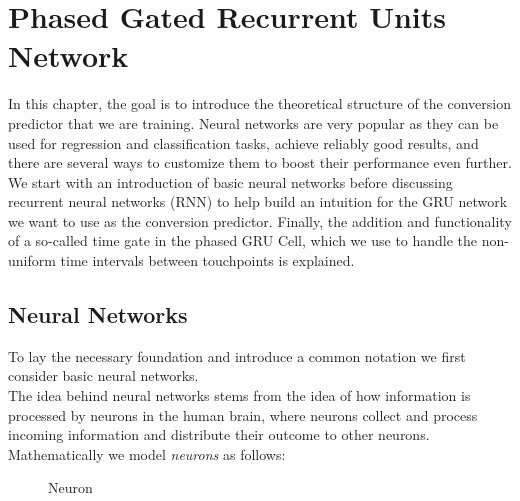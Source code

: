 
\chapter{Phased Gated Recurrent Units Network}
In this chapter, the goal is to introduce the theoretical structure of the conversion predictor that we are training. 
Neural networks are very popular as they can be used for regression and classification tasks, achieve reliably good results, and there are several ways to customize them to boost their performance even further.   \\
We start with an introduction of basic neural networks before discussing recurrent neural networks (RNN) to help build an intuition for the GRU network we want to use as the conversion predictor. 
Finally, the addition and functionality of a so-called time gate in the phased GRU Cell, which we use to handle the non-uniform time intervals between touchpoints is explained.

\section{Neural Networks}

To lay the necessary foundation and introduce a common notation we first consider basic neural networks. \\
The idea behind neural networks stems from the idea of how information is processed by neurons in the human brain, where neurons collect and process incoming information and distribute their outcome to other neurons. \\
Mathematically we model \textit{neurons} as follows:

\begin{figure}[h]
\centering
{}
\label{abb:neuron}
\caption{Neuron}
\end{figure}

